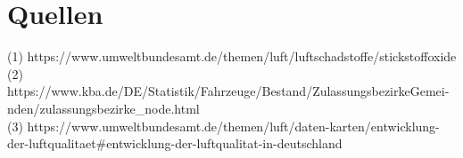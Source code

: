 \documentclass[11pt,a4paper,oneside,german]{article}
\begin{document}
	\section{Quellen}
	
	(1) https://www.umweltbundesamt.de/themen/luft/luftschadstoffe/stickstoffoxide\\
	(2) https://www.kba.de/DE/Statistik/Fahrzeuge/Bestand/ZulassungsbezirkeGemei-nden/zulassungsbezirke\_node.html\\
	(3) https://www.umweltbundesamt.de/themen/luft/daten-karten/entwicklung-der-luftqualitaet\#entwicklung-der-luftqualitat-in-deutschland
	
	
	
\end{document}
